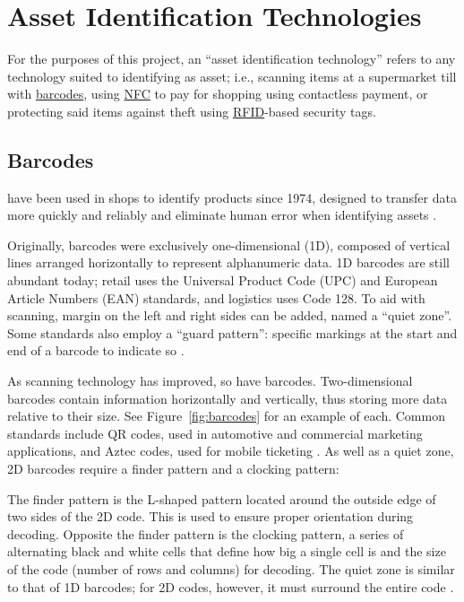 \section{Asset Identification Technologies}

For the purposes of this project, an \enquote{asset
  identification technology} refers to any technology suited
to identifying as asset; i.e., scanning items at a
supermarket till with \hyperref[ss:barcodes]{barcodes},
using \hyperref[ss:nfc]{NFC} to pay for shopping using
contactless payment, or protecting said items against theft
using \hyperref[ss:rfid]{RFID}-based security tags.

\subsection{Barcodes} \label{ss:barcodes}

 have been used in shops to
identify products
since 1974, designed to transfer data more quickly and
reliably and eliminate human error when identifying assets
\parencite{whatIsABarcode}.

Originally, barcodes were exclusively one-dimensional (1D),
composed of vertical lines arranged horizontally to
represent alphanumeric data.
1D barcodes are still abundant today; retail uses
the Universal Product Code (UPC) and European Article
Numbers (EAN) standards, and logistics uses Code 128.
To aid with scanning, margin on the left and right sides
can be added, named a \enquote{quiet zone}.
Some standards also employ a \enquote{guard pattern}:
specific markings at the start and end of a barcode to
indicate so \parencite{whatIsABarcode}.

As scanning technology has improved, so have barcodes.
Two-dimensional barcodes contain information horizontally
and vertically, thus storing more data relative to their
size.
See Figure~\ref{fig:barcodes} for an example of each.
Common standards include QR codes, used in automotive and
commercial marketing applications, and Aztec codes, used
for mobile ticketing \parencite{whatIsABarcode}.
As well as a quiet zone, 2D barcodes require a finder
pattern and a clocking pattern: 

\begin{displayquote}
  The finder pattern is the L-shaped
  pattern located around the outside edge of two sides of the
  2D code.
  This is used to ensure proper orientation during decoding.
  Opposite the finder pattern is the clocking pattern, a
  series of alternating black and white cells that define how
  big a single cell is and the size of the code (number of
  rows and columns) for decoding.
  The quiet zone is similar to that of 1D barcodes; for 2D
  codes, however, it must surround the entire code
  \parencite{whatIsABarcode}.
\end{displayquote}

